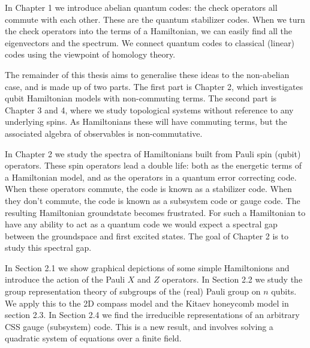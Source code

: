 \documentclass[11pt,oneside]{report}
\begin{document}
In Chapter 1 we introduce 
abelian quantum codes: the check operators
all commute with each other.
These are the quantum stabilizer codes.
When we turn the check operators into the terms of a
Hamiltonian, we can easily find all the eigenvectors and the spectrum.
We connect quantum codes to classical
(linear) codes using the viewpoint of homology theory. 

The remainder of this thesis aims to generalise these
ideas to the non-abelian case, 
and is made up of two parts.
The first part is Chapter 2, which investigates
qubit Hamiltonian models with non-commuting terms.
The second part is Chapter 3 and 4, where we study
topological systems without reference to any underlying spins.
As Hamiltonians these will have
commuting terms, but the associated algebra of observables
is non-commutative.

In Chapter 2 we study the spectra of 
Hamiltonians built from Pauli spin (qubit) operators.
These spin operators lead a double life:
both as the energetic terms of a Hamiltonian model, and as
the operators in a quantum error correcting code.
When these operators commute, the code is known as a stabilizer code.
When they don't commute, the code is known as a subsystem code or gauge code.
The resulting Hamiltonian groundstate becomes frustrated.
For such a Hamiltonian to have any ability to act as a quantum
code we would expect a spectral gap between the
groundspace and first excited states.
The goal of Chapter 2 is to study this spectral gap.

In Section 2.1 we show graphical depictions of
some simple Hamiltonions and introduce the action of
the Pauli $X$ and $Z$ operators.
In Section 2.2 we study the group representation theory
of subgroups of the (real) Pauli group on $n$ qubits.
We apply this to the 2D compass model and the
Kitaev honeycomb model in section 2.3. 
In Section 2.4 we find the 
irreducible representations of an arbitrary CSS gauge (subsystem) code.
This is a new result, and involves solving a quadratic 
system of equations over a finite field.
\end{document}
